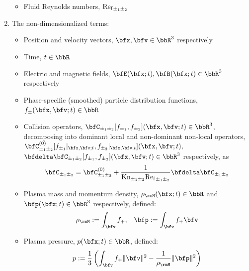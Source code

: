 \begin{enumerate}
\begin{itemize}
            \item  Fluid Reynolds numbers, ${\mathrm{Re}_{\mathrm{f}}}_{\pm_{1}\pm_{2}}$
        \end{itemize}

        \item  The non-dimensionalized terms: 
        \begin{itemize}
            \item  Position and velocity vectors, $\bfx, \bfv  \in  \bbR^{3}$ respectively
            
            \item  Time, $t  \in  \bbR$
            
            \item  Electric and magnetic fields, $\bfE(\bfx; t), \bfB(\bfx; t)  \in  \bbR^{3}$ respectively
            
            \item  Phase-specific (smoothed) particle distribution functions, $f_{\pm}(\bfx, \bfv; t)  \in  \bbR$
            
            \item  Collision operators, $\bfC_{\pm_{1}\pm_{2}}[f_{\pm_{1}}, f_{\pm_{2}}](\bfx, \bfv; t)  \in  \bbR^{3}$, decomposing into dominant local and non-dominant non-local operators, $\bfC_{\pm_{1}\pm_{2}}^{(0)}[f_{\pm_{1}}|_{\bfx, \bfv; t}, f_{\pm_{2}}|_{\bfx, \bfv; t}](\bfx, \bfv; t),$ \\ $\bfdelta\bfC_{\pm_{1}\pm_{2}}[f_{\pm_{1}}, f_{\pm_{2}}](\bfx, \bfv; t)  \in  \bbR^{3}$ respectively, as
            \begin{equation}
                \bfC_{\pm_{1}\pm_{2}}  =  \bfC_{\pm_{1}\pm_{2}}^{(0)} + \frac{1}{\rmKn_{\pm_{1}\pm_{2}}{\rmRef}_{\pm_{1}\pm_{2}}}\bfdelta\bfC_{\pm_{1}\pm_{2}}
            \end{equation}

            \item  Plasma mass and momentum density, $\rho_{\rmM}(\bfx; t)  \in  \bbR$ and $\bfp(\bfx; t)  \in  \bbR^{3}$ respectively, defined:
            \begin{align}
                \rho_{\rmM}  :=  \int_{\bfv}f_{+},  &&
                       \bfp  :=  \int_{\bfv}f_{+}\bfv
            \end{align}

            \item  Plasma pressure, $p(\bfx; t)  \in  \bbR$, defined:
            \begin{equation}
                p  :=  \frac{1}{3}\left(\int_{\bfv}f_{+}\|\bfv\|^{2} - \frac{1}{\rho_{\rmM}}\|\bfp\|^{2}\right)
            \end{equation}


\end{itemize}
\end{enumerate}
